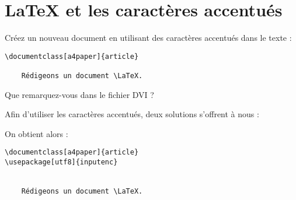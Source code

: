 











\section{\LaTeX{} et les caractères accentués}

Créez un nouveau document en utilisant des caractères accentués dans le texte :

\begin{exemple}[H] %
\begin{verbatim}
\documentclass[a4paper]{article}

    Rédigeons un document \LaTeX.

\end{verbatim}
\end{exemple}

Que remarquez-vous dans le fichier DVI ?

Afin d'utiliser les caractères accentués, deux solutions s'offrent à
nous :


On obtient alors :
\begin{exemple}[H] %
  \caption{Usage des caractères accentués avec \LaTeX (encodage
    iso-8859-1).}
\begin{verbatim}
\documentclass[a4paper]{article}
\usepackage[utf8]{inputenc}


    Rédigeons un document \LaTeX.

\end{verbatim}
\end{exemple}

